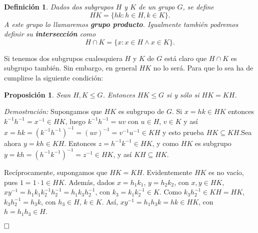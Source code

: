 \documentclass[12pt]{article}
\newtheorem{proposition}[theorem]{Proposición}
\newtheorem{definition}[theorem]{Definición}
\begin{document}
\begin{definition} Dados dos subgrupos $H$ y $K$ de un grupo $G$, se define $$HK = \lbrace hk : h \in H, k \in K \rbrace.$$ A este grupo lo llamaremos \textbf{grupo producto}. Igualmente también podremos definir su \textbf{intersección} como
$$H \cap K = \lbrace x: x\in H \wedge x \in K \rbrace.$$
\end{definition}

Si tenemos dos subgrupos cualesquiera $H$ y $K$ de $G$ está claro que $H \cap K$ es subgrupo también. Sin embargo, en general $HK$ no lo será. Para que lo sea ha de cumplirse la siguiente condición:

\begin{proposition}\label{eq:progruesgru} Sean $H,K \leq G$. Entonces $HK \leq G$ si y sólo si $HK = KH$.
\end{proposition}
\emph{Demostración: }Supongamos que $HK$ es subgrupo de $G$. Si $x = hk \in HK$ entonces $k^{-1}h^{-1} = x^{-1} \in HK$, luego $k^{-1}h^{-1} = uv$ con $u \in H$, $v \in K$ y así $x = hk = (k^{-1}h^{-1})^{-1} = (uv)^{-1} = v^{-1}u^{-1} \in KH$ y esto prueba $HK \subseteq KH$.Sea ahora $y = kh \in KH$. Entonces $z = h^{-1}k^{-1} \in HK$, y como $HK$ es subgrupo $y = kh = (h^{-1}k^{-1})^{-1} = z^{-1} \in HK$, y así $KH \subseteq HK$.
 
Recíprocamente, supongamos que $HK = KH$. Evidentemente $HK$ es no vacío, pues $1 = 1 \cdot 1 \in HK$. Además, dados $x = h_{1}k_{1}$, $y = h_{2}k_{2}$, con $x,y \in HK$,$xy^{-1} = h_{1}k_{1}k_{2}^{-1}h_{2}^{-1} = h_{1}k_{3}h_{2}^{-1}$, con $k_{3} = k_{1}k_{2}^{-1} \in K$. Como $k_{3}h_{2}^{-1} \in KH = HK$, $k_{3}h_{2}^{-1} = h_{3}k$, con $h_{3} \in H$, $k \in K$. Así, $xy^{-1} = h_{1}h_{3}k = hk \in HK$, con $h = h_{1}h_{3} \in H$.

$\hfill \square$
\end{document}
